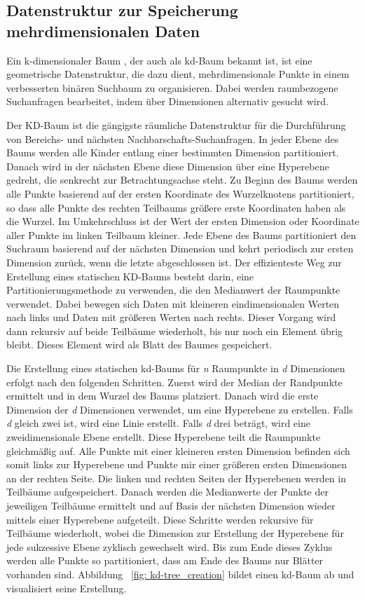 \subsection{Datenstruktur zur Speicherung mehrdimensionalen Daten}

Ein k-dimensionaler Baum , der auch als kd-Baum bekannt ist, ist eine geometrische Datenstruktur, die dazu dient, mehrdimensionale Punkte in einem verbesserten binären Suchbaum zu organisieren. Dabei werden raumbezogene Suchanfragen bearbeitet, indem über Dimensionen alternativ gesucht wird. \autocite[92]{saha_advanced_2019} \autocite{bentley_fast_1978}

Der KD-Baum ist die gängigste räumliche Datenstruktur für die Durchführung von Bereichs- und nächsten Nachbarschafts-Suchanfragen. In jeder Ebene des Baums werden alle Kinder entlang einer bestimmten Dimension partitioniert. Danach wird in der nächsten Ebene diese Dimension über eine Hyperebene gedreht, die senkrecht zur Betrachtungsachse steht. Zu Beginn des Baums werden alle Punkte basierend auf der ersten Koordinate des Wurzelknotens partitioniert, so dass alle Punkte des rechten Teilbaums größere erste Koordinaten haben als die Wurzel. Im Umkehrschluss ist der Wert der ersten Dimension oder Koordinate aller Punkte im linken Teilbaum kleiner. Jede Ebene des Baums partitioniert den Suchraum basierend auf der nächsten Dimension und kehrt periodisch zur ersten Dimension zurück, wenn die letzte abgeschlossen ist. Der effizienteste Weg zur Erstellung eines statischen KD-Baums besteht darin, eine Partitionierungsmethode zu verwenden, die den Medianwert der Raumpunkte verwendet. Dabei bewegen sich Daten mit kleineren eindimensionalen Werten nach links und Daten mit größeren Werten nach rechts. Dieser Vorgang wird dann rekursiv auf beide Teilbäume wiederholt, bis nur noch ein Element übrig bleibt. Dieses Element wird als Blatt des Baumes gespeichert. \autocite[92]{saha_advanced_2019}

Die Erstellung eines statischen kd-Baums für \textit{n} Raumpunkte in \textit{d} Dimensionen erfolgt nach den folgenden Schritten. Zuerst wird der Median der Randpunkte ermittelt und in dem Wurzel des Baums platziert. Danach wird die erste Dimension der \textit{d} Dimensionen verwendet, um eine Hyperebene zu erstellen. Falls \textit{d} gleich zwei ist, wird eine Linie erstellt. Falls \textit{d} drei beträgt, wird eine zweidimensionale Ebene erstellt. Diese Hyperebene teilt die Raumpunkte gleichmäßig auf. Alle Punkte mit einer kleineren ersten Dimension befinden sich somit links zur Hyperebene und Punkte mir einer größeren ersten Dimensionen an der rechten Seite. Die linken und rechten Seiten der Hyperebenen werden in Teilbäume aufgespeichert. Danach werden die Medianwerte der Punkte der jeweiligen Teilbäume ermittelt und auf Basis der nächsten Dimension wieder mittels einer Hyperebene aufgeteilt. Diese Schritte werden rekursive für Teilbäume wiederholt, wobei die Dimension zur Erstellung der Hyperebene für jede sukzessive Ebene zyklisch gewechselt wird. Bis zum Ende dieses Zyklus werden alle Punkte so partitioniert, dass am Ende des Baums nur Blätter vorhanden sind. Abbildung ~\ref{fig: kd-tree_creation} bildet einen kd-Baum ab und visualisiert seine Erstellung. \autocite[93-94]{saha_advanced_2019} 

